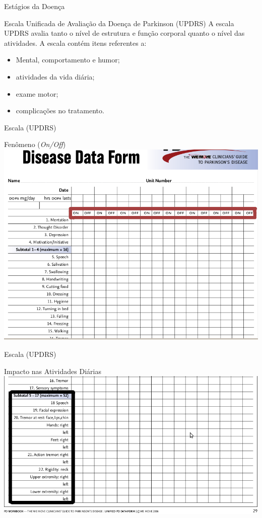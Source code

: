 \documentclass{beamer}
\begin{document}
\begin{frame}{Estágios da Doença}
  \begin{block}{Escala Unificada de Avaliação da Doença de Parkinson (UPDRS)}
    A escala UPDRS avalia tanto o nível de estrutura e função corporal quanto o nível das atividades.
      A escala contém itens referentes a:
	\begin{itemize}[<+->]
	 \item Mental, comportamento e humor;
	 \item atividades da vida diária;
	 \item exame motor;
	 \item complicações no tratamento.
	\end{itemize}
 \end{block}
\end{frame}

\begin{frame}{Escala (UPDRS)} 
    \begin{block}{Fenômeno (\textit{On/Off})}
      \center \includegraphics[height=2.4 in]{img/updr1-sel.png}
    \end{block}		
\end{frame}

\begin{frame}{Escala (UPDRS)} 
    \begin{block}{Impacto nas Atividades Diárias}
      \center \includegraphics[height=2.0 in]{img/updr2-sel.png}
    \end{block}
\end{frame}
\end{document}
